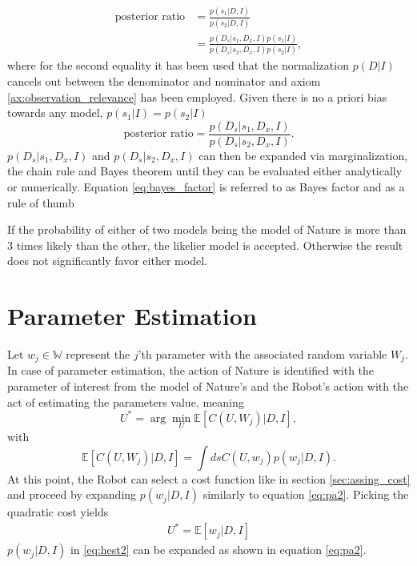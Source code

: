 \begin{equation}
	\begin{split}
		\text{posterior ratio} &= \frac{p(s_1|D,I)}{p(s_2|D,I)}\\
		& = \frac{p(D_s|s_1,D_x,I)p(s_1|I)}{p(D_s|s_2,D_x,I)p(s_2|I)},
	\end{split}
\end{equation}
where for the second equality it has been used that the normalization $p(D|I)$ cancels out between the denominator and nominator and axiom \ref{ax:observation_relevance} has been employed. Given there is no a priori bias towards any model, $p(s_1|I) = p(s_2|I)$
\begin{equation}
	\text{posterior ratio} = \frac{p(D_s|s_1,D_x,I)}{p(D_s|s_2,D_x,I)}.
	\label{eq:bayes_factor}
\end{equation}
$p(D_s|s_1,D_x,I)$ and $p(D_s|s_2,D_x,I)$ can then be expanded via marginalization, the chain rule and Bayes theorem until they can be evaluated either analytically or numerically. Equation \eqref{eq:bayes_factor} is referred to as Bayes factor and as a rule of thumb

\begin{definition}
	If the probability of either of two models being the model of Nature is more than 3 times likely than the other, the likelier model is accepted. Otherwise the result does not significantly favor either model.
\end{definition}



\section{Parameter Estimation}
Let $w_j\in \mathbb{W}$ represent the $j$'th parameter with the associated random variable $W_j$. In case of parameter estimation, the action of Nature is identified with the parameter of interest from the model of Nature's and the Robot's action with the act of estimating the parameters value, meaning
\begin{equation}
	U^*=\arg\min_U\mathbb{E}[C(U, W_j)|D,I],
\end{equation}
with
\begin{equation}
	\mathbb{E}[C(U, W_j)|D,I] = \int ds C(U,w_j)p(w_j|D,I).
\end{equation}
At this point, the Robot can select a cost function like in section \ref{sec:assing_cost} and proceed by expanding $p(w_j|D,I)$ similarly to equation \eqref{eq:pa2}. Picking the quadratic cost yields 
\begin{equation}
	\begin{split}
		U^* = \mathbb{E}[w_j|D,I]
	\end{split}
	\label{eq:hest2}
\end{equation}
$p(w_j|D,I)$ in \eqref{eq:hest2} can be expanded as shown in equation \eqref{eq:pa2}.
